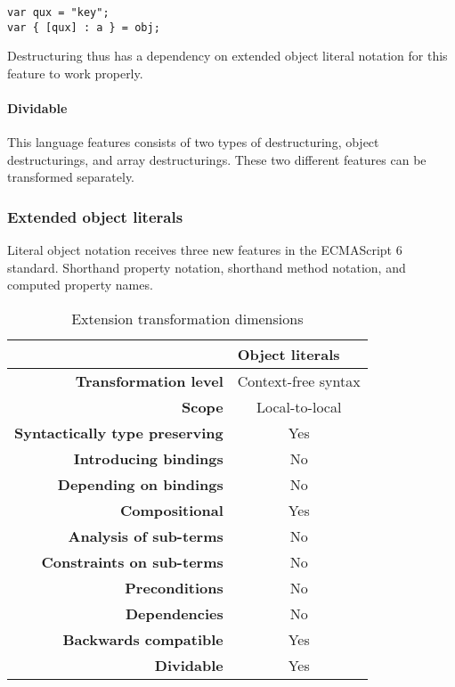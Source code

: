 \documentclass[10pt,a4paper]{article}
\begin{document}
\begin{lstlisting}
var qux = "key";
var { [qux] : a } = obj;
\end{lstlisting}

Destructuring thus has a dependency on extended object literal notation for this feature to work properly.

\paragraph{Dividable}
This language features consists of two types of destructuring, object destructurings, and array destructurings. These two different features can be transformed separately. 

\subsubsection{Extended object literals} \label{object-literals}
Literal object notation receives three new features in the ECMAScript 6 standard\cite[12.2.5]{SpecJS}. Shorthand property notation, shorthand method notation, and computed property names.

\begin{table}[H]
\centering
\caption{Extension transformation dimensions}
\label{object-literals-table}
\begin{tabular}{@{}rc@{}}
\toprule
                                       & \multicolumn{1}{l}{\textbf{Object literals}} \\ \midrule
\textbf{Transformation level}          & Context-free syntax                          \\
\textbf{Scope}                         & Local-to-local                               \\
\textbf{Syntactically type preserving} & Yes                                          \\
\textbf{Introducing bindings}          & No                                          \\%
\textbf{Depending on bindings}         & No                                           \\
\textbf{Compositional}                 & Yes                                          \\
\textbf{Analysis of sub-terms}          & No                                          \\
\textbf{Constraints on sub-terms}       & No                                           \\
\textbf{Preconditions}                 & No                                          \\
\textbf{Dependencies}                  & No                                           \\
\textbf{Backwards compatible}          & Yes                                          \\
\textbf{Dividable}                     & Yes                                           \\ \bottomrule
\end{tabular}
\end{table}
\end{document}
